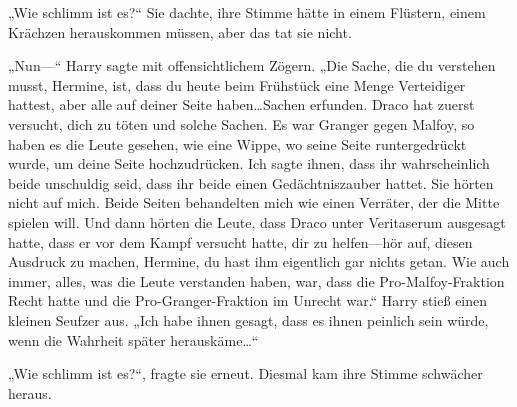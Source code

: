 „Wie schlimm ist es?“ Sie dachte, ihre Stimme hätte in einem Flüstern, einem Krächzen herauskommen müssen, aber das tat sie nicht.

„Nun—“ Harry sagte mit offensichtlichem Zögern. „Die Sache, die du verstehen musst, Hermine, ist, dass du heute beim Frühstück eine Menge Verteidiger hattest, aber alle auf deiner Seite haben…Sachen erfunden. Draco hat zuerst versucht, dich zu töten und solche Sachen. Es war Granger gegen Malfoy, so haben es die Leute gesehen, wie eine Wippe, wo seine Seite runtergedrückt wurde, um deine Seite hochzudrücken. Ich sagte ihnen, dass ihr wahrscheinlich beide unschuldig seid, dass ihr beide einen Gedächtniszauber hattet. Sie hörten nicht auf mich. Beide Seiten behandelten mich wie einen Verräter, der die Mitte spielen will. Und dann hörten die Leute, dass Draco unter Veritaserum ausgesagt hatte, dass er vor dem Kampf versucht hatte, dir zu helfen—hör auf, diesen Ausdruck zu machen, Hermine, du hast ihm eigentlich gar nichts getan. Wie auch immer, alles, was die Leute verstanden haben, war, dass die Pro-Malfoy-Fraktion Recht hatte und die Pro-Granger-Fraktion im Unrecht war.“ Harry stieß einen kleinen Seufzer aus. „Ich habe ihnen gesagt, dass es ihnen peinlich sein würde, wenn die Wahrheit später herauskäme…“

„Wie schlimm ist es?“, fragte sie erneut. Diesmal kam ihre Stimme schwächer heraus.

